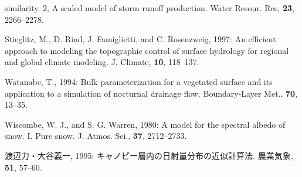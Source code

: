 \begin{description}
	    similarity. 2, A scaled model of storm runoff
	    production. {Water Resour. Res}, {\bf 23}, 2266--2278. 
 \item[] Stieglitz, M., D. Rind, J. Famiglietti, and C. Rosenzweig,
	    1997: An efficient approach to modeling the topographic
	    control of surface hydrology for regional and global climate
	    modeling. {J. Climate}, {\bf 10}, 118--137. 
 \item[] Watanabe, T., 1994: Bulk parameterization for a vegetated
	    surface and its application to a simulation of nocturnal
	    drainage flow. {Boundary-Layer Met.}, {\bf 70}, 13--35.
 \item[] Wiscombe, W. J., and S. G. Warren, 1980: A model for the
	    spectral albedo of snow. I. Pure snow. {J. Atmos. Sci.},
	    {\bf 37}, 2712--2733. 
 \item[] 渡辺力・大谷義一, 1995: キャノピー層内の日射量分布の近似計算法.
	    {農業気象}, {\bf 51}, 57--60. 
\end{description}

